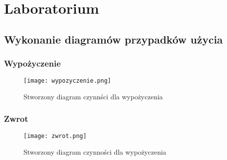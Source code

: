 \documentclass{article}
\begin{document}
	\section{Laboratorium}
	\subsection{Wykonanie diagramów przypadków użycia}
	\subsubsection{Wypożyczenie}
	\begin{figure}[!ht]
	\centering
	\texttt{[image: wypozyczenie.png]}
	\caption{Stworzony diagram czynnści dla wypożyczenia}
	\label{fig:obrazek 1}
	\end{figure}

\newpage
	\subsubsection{Zwrot}
\begin{figure}[!ht]
	\centering
	\texttt{[image: zwrot.png]}
	\caption{Stworzony diagram czynności dla wypożyczenia}
	\label{fig:obrazek 2}
\end{figure}

	
\end{document}

